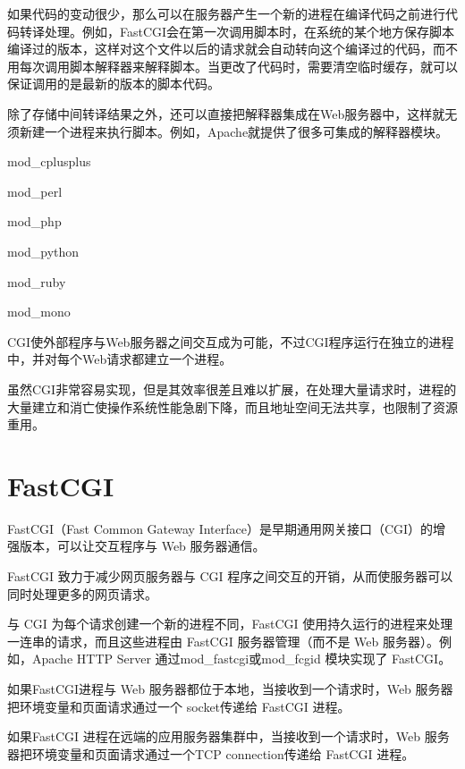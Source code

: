 如果代码的变动很少，那么可以在服务器产生一个新的进程在编译代码之前进行代码转译处理。例如，FastCGI会在第一次调用脚本时，在系统的某个地方保存脚本编译过的版本，这样对这个文件以后的请求就会自动转向这个编译过的代码，而不用每次调用脚本解释器来解释脚本。当更改了代码时，需要清空临时缓存，就可以保证调用的是最新的版本的脚本代码。

除了存储中间转译结果之外，还可以直接把解释器集成在Web服务器中，这样就无须新建一个进程来执行脚本。例如，Apache就提供了很多可集成的解释器模块。

\begin{compactitem}
\item mod\_cplusplus
\item mod\_perl
\item mod\_php
\item mod\_python
\item mod\_ruby
\item mod\_mono
\end{compactitem}


CGI使外部程序与Web服务器之间交互成为可能，不过CGI程序运行在独立的进程中，并对每个Web请求都建立一个进程。

虽然CGI非常容易实现，但是其效率很差且难以扩展，在处理大量请求时，进程的大量建立和消亡使操作系统性能急剧下降，而且地址空间无法共享，也限制了资源重用。


\section{FastCGI}





FastCGI（Fast Common Gateway Interface）是早期通用网关接口（CGI）的增强版本，可以让交互程序与 Web 服务器通信。

FastCGI 致力于减少网页服务器与 CGI 程序之间交互的开销，从而使服务器可以同时处理更多的网页请求。


与 CGI 为每个请求创建一个新的进程不同，FastCGI 使用持久运行的进程来处理一连串的请求，而且这些进程由 FastCGI 服务器管理（而不是 Web 服务器）。例如，Apache HTTP Server 通过mod\_fastcgi或mod\_fcgid 模块实现了 FastCGI。

\begin{compactitem}
\item 如果FastCGI进程与 Web 服务器都位于本地，当接收到一个请求时，Web 服务器把环境变量和页面请求通过一个 socket传递给 FastCGI 进程。
\item  如果FastCGI 进程在远端的应用服务器集群中，当接收到一个请求时，Web 服务器把环境变量和页面请求通过一个TCP connection传递给 FastCGI 进程。
\end{compactitem}


